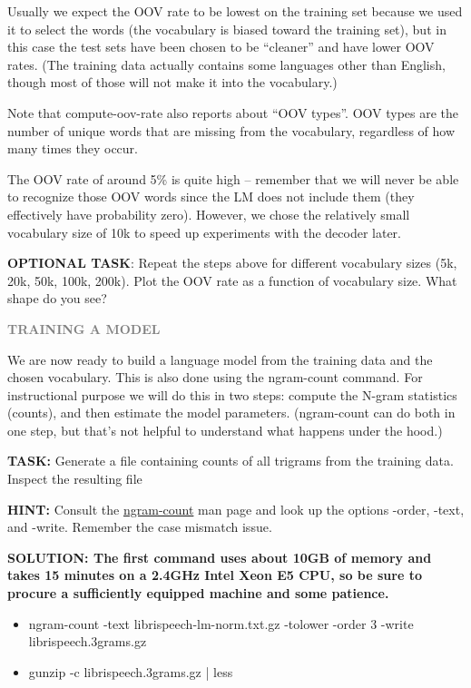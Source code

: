 Usually we expect the OOV rate to be lowest on the training set because we used it to select the words (the vocabulary is biased toward the training set), but in this case the test sets have been chosen to be “cleaner” and have lower OOV rates. (The training data actually contains some languages other than English, though most of those will not make it into the vocabulary.)

Note that compute-oov-rate also reports about “OOV types”. OOV types are the number of unique words that are missing from the vocabulary, regardless of how many times they occur.

The OOV rate of around 5\% is quite high – remember that we will never be able to recognize those OOV words since the LM does not include them (they effectively have probability zero). However, we chose the relatively small vocabulary size of 10k to speed up experiments with the decoder later.

{\bf OPTIONAL TASK}: Repeat the steps above for different vocabulary sizes (5k, 20k, 50k, 100k, 200k). Plot the OOV rate as a function of vocabulary size. What shape do you see?

{\bf \textcolor{gray}{TRAINING A MODEL}}

We are now ready to build a language model from the training data and the chosen vocabulary. This is also done using the ngram-count command. For instructional purpose we will do this in two steps: compute the N-gram statistics (counts), and then estimate the model parameters. (ngram-count can do both in one step, but that’s not helpful to understand what happens under the hood.)

{\bf TASK:} Generate a file containing counts of all trigrams from the training data. Inspect the resulting file

{\bf HINT:}  Consult the \href{http://www.speech.sri.com/projects/srilm/manpages/ngram-count.1.html}{ngram-count} man page and look up the options -order, -text, and -write. Remember the case mismatch issue.

{\bf SOLUTION: The first command uses about 10GB of memory and takes 15 minutes on a 2.4GHz Intel Xeon E5 CPU, so be sure to procure a sufficiently equipped machine and some patience.}
\begin{itemize}
	\item ngram-count -text librispeech-lm-norm.txt.gz -tolower -order 3 -write librispeech.3grams.gz
	\item gunzip -c librispeech.3grams.gz | less
\end{itemize}

